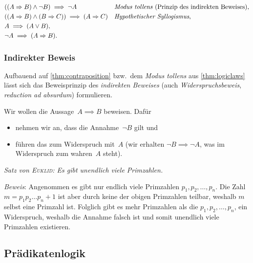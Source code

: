 \documentclass[a4paper]{article}
\begin{document}
\begin{theorem}
\begin{align*}
         & ((A \Rightarrow B) \wedge \neg B) \implies \neg A                       &  & \text{\emph{Modus tollens} (Prinzip des indirekten Beweises),}    \\
         & ((A \Rightarrow B) \wedge (B \Rightarrow C)) \implies (A \Rightarrow C) &  & \text{\emph{Hypothetischer Syllogismus},}                         \\
         & A \implies (A \vee B),                                                                                                                         \\
         & \neg A \implies (A \Rightarrow B).
    \end{align*}
\end{theorem}

\subsubsection{Indirekter Beweis}

Aufbauend auf \cref{thm:contraposition} bzw.\ dem \emph{Modus tollens} aus \cref{thm:logiclaws} lässt sich das Beweisprinzip des \emph{indirekten Beweises} (auch \emph{Widerspruchsbeweis}, \emph{reduction ad absurdum}) formulieren.

Wir wollen die Aussage~$A \implies B$ beweisen. Dafür
\begin{itemize}
    \item nehmen wir an, dass die Annahme~$\neg B$ gilt und
    \item führen das zum Widerspruch mit~$A$ (wir erhalten $\neg B \implies \neg A$, was im Widerspruch zum wahren~$A$ steht).
\end{itemize}

\begin{example}
    \emph{Satz von \textsc{Euklid}: Es gibt unendlich viele Primzahlen.}

    \emph{Beweis}: Angenommen es gibt nur endlich viele Primzahlen $p_1, p_2, \dots, p_n$. Die Zahl $m = p_1 p_2 \dots p_n + 1$ ist aber durch keine der obigen Primzahlen teilbar, weshalb $m$ selbst eine Primzahl ist. Folglich gibt es mehr Primzahlen als die $p_1, p_2, \dots, p_n$, ein Widerspruch, weshalb die Annahme falsch ist und somit unendlich viele Primzahlen existieren.
\end{example}

\subsection{Prädikatenlogik}
\end{document}

